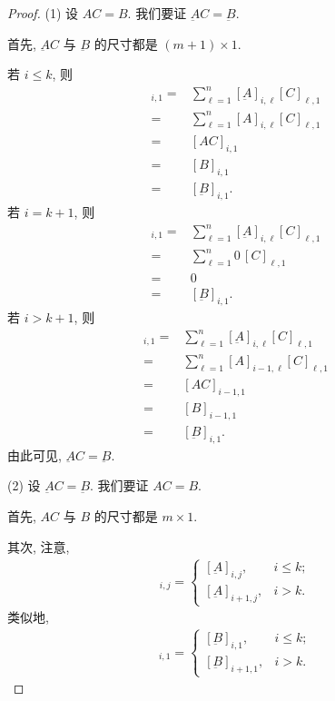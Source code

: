 \documentclass[../libro.tex]{subfiles}
\begin{document}
\begin{proof}
    (1)
    设 \(AC = B\).
    我们要证 \(\underbar{A}C = \underbar{B}\).

    首先, \(\underbar{A}C\) 与 \(\underbar{B}\)
    的尺寸都是 \((m+1) \times 1\).

    若 \(i \leq k\), 则
    \begin{align*}
        [\underbar{A}C]_{i,1}
        = {} &
        \sum_{\ell = 1}^{n}
        {[\underbar{A}]_{i,\ell} [C]_{\ell,1}}
        \\
        = {} &
        \sum_{\ell = 1}^{n}
        {[A]_{i,\ell} [C]_{\ell,1}}
        \\
        = {} & [AC]_{i,1}
        \\
        = {} & [B]_{i,1}
        \\
        = {} &
        [\underbar{B}]_{i,1}.
    \end{align*}
    若 \(i = k + 1\), 则
    \begin{align*}
        [\underbar{A}C]_{i,1}
        = {} &
        \sum_{\ell = 1}^{n}
        {[\underbar{A}]_{i,\ell} [C]_{\ell,1}}
        \\
        = {} &
        \sum_{\ell = 1}^{n}
        {0\,[C]_{\ell,1}}
        \\
        = {} & 0
        \\
        = {} &
        [\underbar{B}]_{i,1}.
    \end{align*}
    若 \(i > k + 1\), 则
    \begin{align*}
        [\underbar{A}C]_{i,1}
        = {} &
        \sum_{\ell = 1}^{n}
        {[\underbar{A}]_{i,\ell} [C]_{\ell,1}}
        \\
        = {} &
        \sum_{\ell = 1}^{n}
        {[A]_{i-1,\ell} [C]_{\ell,1}}
        \\
        = {} & [AC]_{i-1,1}
        \\
        = {} & [B]_{i-1,1}
        \\
        = {} &
        [\underbar{B}]_{i,1}.
    \end{align*}
    由此可见, \(\underbar{A}C = \underbar{B}\).

    (2)
    设 \(\underbar{A}C = \underbar{B}\).
    我们要证 \(AC = B\).

    首先, \(AC\) 与 \(B\)
    的尺寸都是 \(m \times 1\).

    其次, 注意,
    \begin{align*}
        [A]_{i,j} =
        \begin{cases}
            [\underbar{A}]_{i,j},   & i \leq k; \\
            [\underbar{A}]_{i+1,j}, & i > k.
        \end{cases}
    \end{align*}
    类似地,
    \begin{align*}
        [B]_{i,1} =
        \begin{cases}
            [\underbar{B}]_{i,1},   & i \leq k; \\
            [\underbar{B}]_{i+1,1}, & i > k.
        \end{cases}
    \end{align*}


\end{proof}
\end{document}
